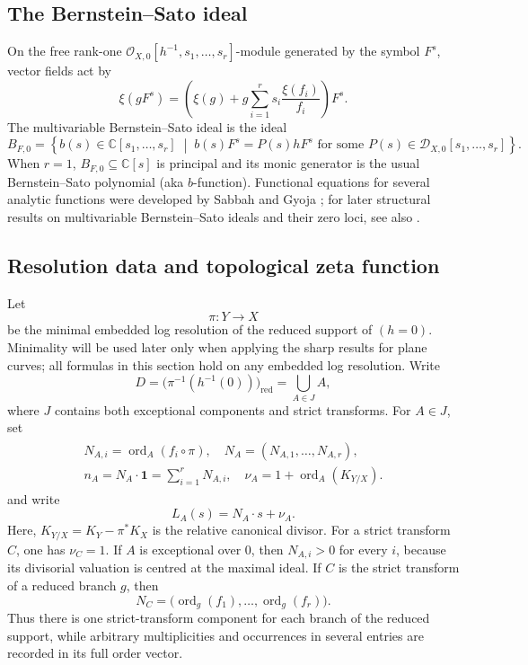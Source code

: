 \documentclass[12pt]{amsart}
\numberwithin{equation}{section}
\theoremstyle{plain}
\theoremstyle{definition}
\theoremstyle{remark}
\theoremstyle{definition}
\DeclareMathOperator{\ord}{ord}
\newcommand{\C}{\mathbb C}
\newcommand{\D}{\mathscr D}
\newcommand{\one}{\mathbf 1}
\begin{document}
\subsection{The Bernstein--Sato ideal} 

 On the free rank-one $\mathcal O_{X,0}[h^{-1},s_1,\ldots,s_r]$-module generated by the symbol $F^s$, vector fields act by
\[
\xi(gF^s)=\left(\xi(g)+g\sum_{i=1}^r s_i\frac{\xi(f_i)}{f_i}\right)F^s.
\]
The multivariable Bernstein--Sato ideal is the ideal
\begin{equation}\label{eq:bernstein-ideal}
B_{F,0}=\left\{b(s)\in\C[s_1,\ldots,s_r]\;\middle|\; b(s)F^s=P(s)hF^s \text{ for some }P(s)\in\D_{X,0}[s_1,\ldots,s_r]\right\}.
\end{equation}
When $r=1$, $B_{F,0}\subseteq\C[s]$ is principal and its monic generator is the usual Bernstein--Sato polynomial (aka $b$-function). Functional equations for several analytic functions were developed by Sabbah and Gyoja \cite{Sabbah1987,Gyoja1993}; for later structural results on multivariable Bernstein--Sato ideals and their zero loci, see also \cite{Maisonobe2023,Budur2015,BvdVWZ2021}.

\subsection{Resolution data and topological zeta function}

Let
\[
 \pi:Y\to  X
\]
be the minimal embedded log resolution of the reduced support of $(h=0)$. Minimality will be used later only when applying the sharp results for plane curves; all formulas in this section hold on any embedded log resolution. Write
\[
    D = \bigl(\pi^{-1}(h^{-1}(0))\bigr)_{\mathrm{red}} = \bigcup_{A\in J}A,
\]
where $J$ contains both exceptional components and strict transforms. For $A\in J$, set
\begin{gather}\label{eq:resolution-data}
    \begin{aligned}
        N_{A,i}=\ord_A(f_i\circ\pi), \quad N_A=(N_{A,1},\ldots,N_{A,r}),\\
        n_A=N_A\cdot\one = \sum_{i=1}^r N_{A,i}, \quad \nu_A=1+\ord_A(K_{Y/X}).
    \end{aligned}
\end{gather}
and write
\begin{equation}\label{eq:candidate-form}
 L_A(s)=N_A\cdot s+\nu_A.
\end{equation}
Here, $K_{Y/X}=K_Y-\pi^*K_X$ is the relative canonical divisor. For a strict transform $C$, one has $\nu_C=1$. If $A$ is exceptional over $0$, then $N_{A,i}>0$ for every $i$, because its divisorial valuation is centred at the maximal ideal. If $C$ is the strict transform of a reduced branch $g$, then
\[
 N_C=\bigl(\ord_g(f_1),\ldots,\ord_g(f_r)\bigr).
\]
Thus there is one strict-transform component for each branch of the reduced support, while arbitrary multiplicities and occurrences in several entries are recorded in its full order vector.
\end{document}
